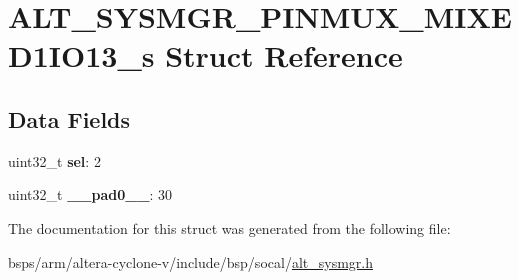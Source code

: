 \hypertarget{structALT__SYSMGR__PINMUX__MIXED1IO13__s}{}\section{A\+L\+T\+\_\+\+S\+Y\+S\+M\+G\+R\+\_\+\+P\+I\+N\+M\+U\+X\+\_\+\+M\+I\+X\+E\+D1\+I\+O13\+\_\+s Struct Reference}
\label{structALT__SYSMGR__PINMUX__MIXED1IO13__s}
\subsection*{Data Fields}
\begin{DoxyCompactItemize}
\item 
\mbox{\label{structALT__SYSMGR__PINMUX__MIXED1IO13__s_aee06c61b896a22d91815d80c62e1f7d0}} 
uint32\+\_\+t {\bfseries sel}\+: 2
\item 
\mbox{\label{structALT__SYSMGR__PINMUX__MIXED1IO13__s_a58277ac4f635a31b9941d756383ffd85}} 
uint32\+\_\+t {\bfseries \+\_\+\+\_\+pad0\+\_\+\+\_\+}\+: 30
\end{DoxyCompactItemize}


The documentation for this struct was generated from the following file\+:\begin{DoxyCompactItemize}
\item 
bsps/arm/altera-\/cyclone-\/v/include/bsp/socal/\mbox{\hyperlink{alt__sysmgr_8h}{alt\+\_\+sysmgr.\+h}}\end{DoxyCompactItemize}
